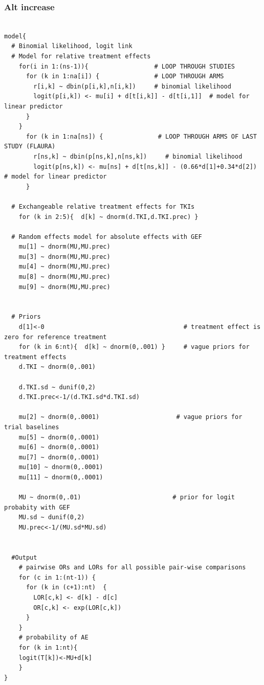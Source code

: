 \documentclass[11pt,final,fleqn]{article}\usepackage[]{graphicx}\usepackage[]{color}
\theoremstyle{plain}
\begin{document}
\begin{appendices}
\subsubsection{Alt increase} 
\begin{verbatim} 

model{
  # Binomial likelihood, logit link
  # Model for relative treatment effects
    for(i in 1:(ns-1)){                  # LOOP THROUGH STUDIES
      for (k in 1:na[i]) {               # LOOP THROUGH ARMS
        r[i,k] ~ dbin(p[i,k],n[i,k])     # binomial likelihood
        logit(p[i,k]) <- mu[i] + d[t[i,k]] - d[t[i,1]]  # model for linear predictor
      }
    }   
      for (k in 1:na[ns]) {               # LOOP THROUGH ARMS OF LAST STUDY (FLAURA)
        r[ns,k] ~ dbin(p[ns,k],n[ns,k])     # binomial likelihood
        logit(p[ns,k]) <- mu[ns] + d[t[ns,k]] - (0.66*d[1]+0.34*d[2])  # model for linear predictor
      }
  
  # Exchangeable relative treatment effects for TKIs
    for (k in 2:5){  d[k] ~ dnorm(d.TKI,d.TKI.prec) }
  
  # Random effects model for absolute effects with GEF
    mu[1] ~ dnorm(MU,MU.prec) 
    mu[3] ~ dnorm(MU,MU.prec) 
    mu[4] ~ dnorm(MU,MU.prec) 
    mu[8] ~ dnorm(MU,MU.prec) 
    mu[9] ~ dnorm(MU,MU.prec) 
       
       
  # Priors
    d[1]<-0                                      # treatment effect is zero for reference treatment
    for (k in 6:nt){  d[k] ~ dnorm(0,.001) }     # vague priors for treatment effects
    d.TKI ~ dnorm(0,.001)
    
    d.TKI.sd ~ dunif(0,2) 
    d.TKI.prec<-1/(d.TKI.sd*d.TKI.sd)
    
    mu[2] ~ dnorm(0,.0001)                     # vague priors for trial baselines
    mu[5] ~ dnorm(0,.0001)                       
    mu[6] ~ dnorm(0,.0001)                       
    mu[7] ~ dnorm(0,.0001)                       
    mu[10] ~ dnorm(0,.0001)                       
    mu[11] ~ dnorm(0,.0001)                       
      
    MU ~ dnorm(0,.01)                         # prior for logit probabity with GEF
    MU.sd ~ dunif(0,2) 
    MU.prec<-1/(MU.sd*MU.sd)
    
      
  #Output 
    # pairwise ORs and LORs for all possible pair-wise comparisons                                       
    for (c in 1:(nt-1)) {                        
      for (k in (c+1):nt)  { 
        LOR[c,k] <- d[k] - d[c]
        OR[c,k] <- exp(LOR[c,k])
      }  
    }
    # probability of AE
    for (k in 1:nt){ 
    logit(T[k])<-MU+d[k]
    }
}


\end{verbatim}
\end{appendices}
\end{document}
